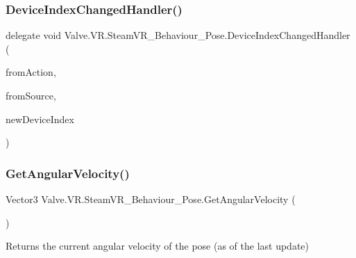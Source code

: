 \mbox{\label{class_valve_1_1_v_r_1_1_steam_v_r___behaviour___pose_ac81003e896ac2766c36b5c7a3438ef7f}} 
\subsubsection{\texorpdfstring{DeviceIndexChangedHandler()}{DeviceIndexChangedHandler()}}
{\footnotesize\ttfamily delegate void Valve.\+V\+R.\+Steam\+V\+R\+\_\+\+Behaviour\+\_\+\+Pose.\+Device\+Index\+Changed\+Handler (\begin{DoxyParamCaption}\item[{\mbox{\hyperlink{class_valve_1_1_v_r_1_1_steam_v_r___behaviour___pose}{Steam\+V\+R\+\_\+\+Behaviour\+\_\+\+Pose}}}]{from\+Action,  }\item[{\mbox{\hyperlink{namespace_valve_1_1_v_r_a82e5bf501cc3aa155444ee3f0662853f}{Steam\+V\+R\+\_\+\+Input\+\_\+\+Sources}}}]{from\+Source,  }\item[{int}]{new\+Device\+Index }\end{DoxyParamCaption})}

\mbox{\label{class_valve_1_1_v_r_1_1_steam_v_r___behaviour___pose_aa89766e6a3e7d4704441f6ccdc0930f3}} 
\subsubsection{\texorpdfstring{GetAngularVelocity()}{GetAngularVelocity()}}
{\footnotesize\ttfamily Vector3 Valve.\+V\+R.\+Steam\+V\+R\+\_\+\+Behaviour\+\_\+\+Pose.\+Get\+Angular\+Velocity (\begin{DoxyParamCaption}{ }\end{DoxyParamCaption})}



Returns the current angular velocity of the pose (as of the last update) 



